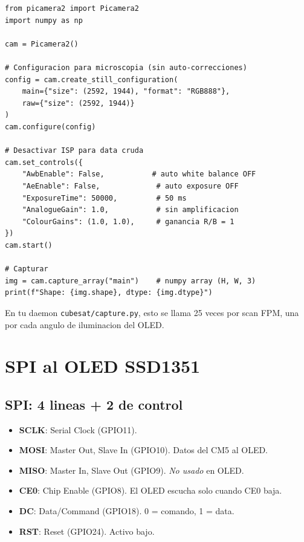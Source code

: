 \documentclass[11pt,a4paper,oneside,openright]{book}
\begin{document}
\begin{lstlisting}
from picamera2 import Picamera2
import numpy as np

cam = Picamera2()

# Configuracion para microscopia (sin auto-correcciones)
config = cam.create_still_configuration(
    main={"size": (2592, 1944), "format": "RGB888"},
    raw={"size": (2592, 1944)}
)
cam.configure(config)

# Desactivar ISP para data cruda
cam.set_controls({
    "AwbEnable": False,           # auto white balance OFF
    "AeEnable": False,             # auto exposure OFF
    "ExposureTime": 50000,         # 50 ms
    "AnalogueGain": 1.0,           # sin amplificacion
    "ColourGains": (1.0, 1.0),     # ganancia R/B = 1
})
cam.start()

# Capturar
img = cam.capture_array("main")    # numpy array (H, W, 3)
print(f"Shape: {img.shape}, dtype: {img.dtype}")
\end{lstlisting}

\begin{payload}
En tu daemon \texttt{cubesat/capture.py}, esto se llama 25 veces por scan
FPM, una por cada angulo de iluminacion del OLED.
\end{payload}

\chapter{SPI al OLED SSD1351}
\label{ch:spi}

\section{SPI: 4 lineas + 2 de control}

\begin{itemize}[leftmargin=2em]
  \item \textbf{SCLK}: Serial Clock (GPIO11).
  \item \textbf{MOSI}: Master Out, Slave In (GPIO10). Datos del CM5 al OLED.
  \item \textbf{MISO}: Master In, Slave Out (GPIO9). \textit{No usado} en OLED.
  \item \textbf{CE0}: Chip Enable (GPIO8). El OLED escucha solo cuando CE0 baja.
  \item \textbf{DC}: Data/Command (GPIO18). 0 = comando, 1 = data.
  \item \textbf{RST}: Reset (GPIO24). Activo bajo.
\end{itemize}
\end{document}
